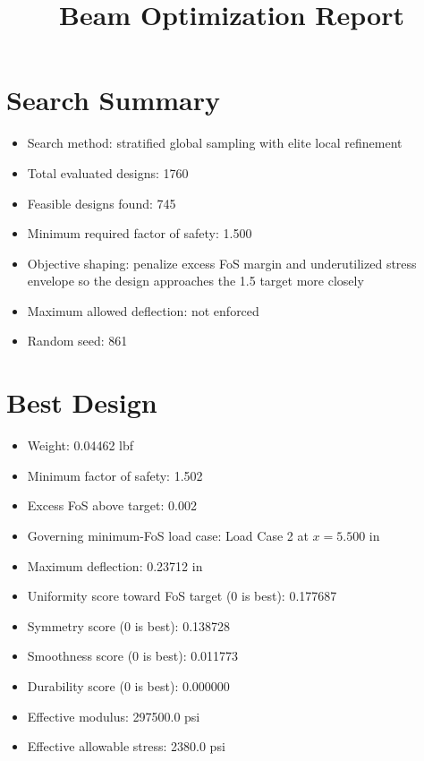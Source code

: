 \documentclass[11pt]{article}
\title{Beam Optimization Report}
\date{}
\begin{document}
\maketitle

\section*{Search Summary}
\begin{itemize}
\item Search method: stratified global sampling with elite local refinement
\item Total evaluated designs: 1760
\item Feasible designs found: 745
\item Minimum required factor of safety: 1.500
\item Objective shaping: penalize excess FoS margin and underutilized stress envelope so the design approaches the 1.5 target more closely
\item Maximum allowed deflection: not enforced
\item Random seed: 861
\end{itemize}

\section*{Best Design}
\begin{itemize}
\item Weight: 0.04462 lbf
\item Minimum factor of safety: 1.502
\item Excess FoS above target: 0.002
\item Governing minimum-FoS load case: Load Case 2 at $x=5.500$ in
\item Maximum deflection: 0.23712 in
\item Uniformity score toward FoS target (0 is best): 0.177687
\item Symmetry score (0 is best): 0.138728
\item Smoothness score (0 is best): 0.011773
\item Durability score (0 is best): 0.000000
\item Effective modulus: 297500.0 psi
\item Effective allowable stress: 2380.0 psi
\end{itemize}
\end{document}
